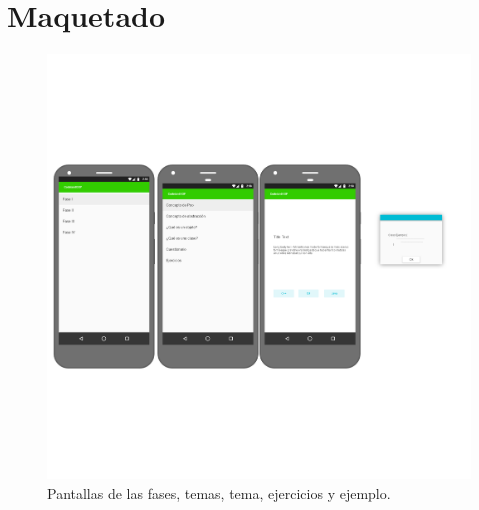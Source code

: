 \section{Maquetado}
\begin{figure}[H]
\begin{center}
\includegraphics[scale=0.2]{img/pantallas1.png} 
\end{center}
\caption{Pantallas de las fases, temas, tema, ejercicios y ejemplo.}
\end{figure}


